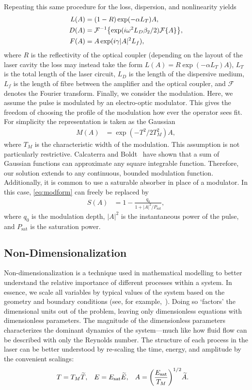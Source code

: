 \documentclass[9pt,twocolumn,twoside]{osajnl}
\let\originalleft\left
\let\originalright\right
\renewcommand{\left}{\mathopen{}\mathclose\bgroup\originalleft}
\renewcommand{\right}{\aftergroup\egroup\originalright}
\newcommand{\Es}{E_{\textrm{sat}}} %
\newcommand{\FT}[1]{\mathcal{F}\left\{ #1 \right\}} %
\newcommand{\FTi}[1]{\mathcal{F}^{-1}\left\{ #1 \right\}} %
\begin{document}
Repeating this same procedure for the loss, dispersion, and nonlinearity yields
\begin{align}
	L(A) &= (1 - R) \exp( - \alpha L_T )A, \\
	D(A) &= \FTi{\exp( i \omega^2 L_D\beta_2/2 ) \FT{A}}, \\
	F(A) &= A \exp( i \gamma |A|^2 L_f ),
\end{align}
where $R$ is the reflectivity of the optical coupler (depending on the layout of the laser cavity the loss may instead take the form $L(A) = R \exp( - \alpha L_T )A$), $L_T$ is the total length of the laser circuit, $L_D$ is the length of the dispersive medium, $L_f$ is the length of fibre between the amplifier and the optical coupler, and $\mathcal{F}$ denotes the Fourier transform. Finally, we consider the modulation. Here, we assume the pulse is modulated by an electro-optic modulator. This gives the freedom of choosing the profile of the modulation how ever the operator sees fit. For simplicity the representation is taken as the Gaussian
\begin{align}
	M(A) &= \exp( -T^2 / 2 T_M^2 ) A,
	\label{eq:modform}
\end{align}
where $T_M$ is the characteristic width of the modulation. This assumption is not particularly restrictive. Calcaterra and Boldt~\cite{calcaterra2008a} have shown that a sum of Gaussian functions can approximate any square integrable function. Therefore, our solution extends to any continuous, bounded modulation function. Additionally, it is common to use a saturable absorber in place of a modulator. In this case, \eqref{eq:modform} can freely be replaced by~\cite{lapre2019, meng2020, oktem2010, woodward2018}
\begin{align}
	S(A) &= 1 - \frac{q_0}{1 + |A|^2 / P_\text{sat}},
\end{align}
where $q_0$ is the modulation depth, $|A|^2$ is the instantaneous power of the pulse, and $P_\text{sat}$ is the saturation power.

\subsection{Non-Dimensionalization}
Non-dimensionalization is a technique used in mathematical modelling to better understand the relative importance of different processes within a system. In essence, we scale all variables by typical values of the system based on the geometry and boundary conditions (see, for example,~\cite{howison2005}). Doing so `factors' the dimensional units out of the problem, leaving only dimensionless equations with dimensionless parameters. The magnitude of the dimensionless parameters characterizes the dominant dynamics of the system---much like how fluid flow can be described with only the Reynolds number. The structure of each process in the laser can be better understood by re-scaling the time, energy, and amplitude by the convenient scalings:
\begin{align}
	T &= T_M \widetilde{T},& E &= \Es \widetilde{E},& A &= \left( \frac{\Es}{T_M} \right)^{1/2} \widetilde{A}.
\end{align}
\end{document}
